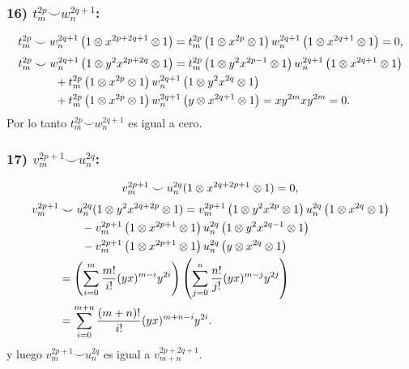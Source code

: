\documentclass[fleqn,../tesis.tex]{subfiles}
\begin{document}
\subsubsection{16) $t_m^{2p} \smile w_n^{2q + 1}$:}
\begin{align*}
	t_m^{2p}\smile w_n^{2q + 1}\left(1\otimes x^{2p + 2q + 1} \otimes 1\right)
		= t_m^{2p}\left(1\otimes x^{2p}\otimes 1\right)w_n^{2q + 1}\left(1\otimes x^{2q + 1}\otimes 1\right) = 0,
\end{align*}
\begin{align*}
	t_m^{2p} & \smile w_n^{2q + 1}\left(1\otimes y^2x^{2p + 2q} \otimes 1\right)
		= t_m^{2p}\left(1\otimes y^2x^{2p - 1}\otimes 1\right)w_n^{2q + 1}\left(1\otimes x^{2q + 1}\otimes 1\right)\\
	&\qquad + t_m^{2p}\left(1 \otimes x^{2p} \otimes 1\right)w_n^{2q + 1}\left(1\otimes y^2x^{2q}\otimes 1\right)\\
	&\qquad + t_m^{2p}\left(1 \otimes x^{2p} \otimes 1\right)w_n^{2q + 1}\left(y\otimes x^{2q +1}\otimes 1\right)
	= xy^{2m}xy^{2m} = 0.
\end{align*}
Por lo tanto $t_m^{2p}\smile w_n^{2q + 1}$ es igual a cero.
\subsubsection{17) $v_m^{2p + 1} \smile u_n^{2q}$:}
\begin{align*}
	v_m^{2p + 1} \smile u_n^{2q}(1 \otimes x^{2q + 2p + 1} \otimes 1) = 0,
\end{align*}
\begin{align*}
	v_m^{2p + 1} &\smile u_n^{2q}(1 \otimes y^2x^{2q + 2p} \otimes 1)
		= v_m^{2p + 1}\left(1\otimes y^2x^{2p}\otimes 1\right)u_n^{2q}\left(1\otimes x^{2q}\otimes 1\right)\\
	&\qquad - v_m^{2p + 1}\left(1 \otimes x^{2p + 1}  \otimes 1\right)u_n^{2q}\left(1\otimes y^2x^{2q - 1}\otimes 1\right)\\
	&\qquad - v_m^{2p + 1}\left(1 \otimes x^{2p + 1} \otimes 1\right)u_n^{2q}\left(y\otimes x^{2q}\otimes 1\right)\\
	&= \left(\sum_{i = 0}^{m}\frac{m!}{i!}(yx)^{m - i}y^{2i}\right)
		\left(\sum_{j = 0}^{n}\frac{n!}{j!}(yx)^{m - j}y^{2j}\right)\\
	&= \sum_{i = 0}^{m + n}\frac{(m + n)!}{i!}(yx)^{m + n - i}y^{2i}.
\end{align*}
y luego $v_m^{2p + 1} \smile u_n^{2q}$ es igual a $v_{m + n}^{2p + 2q + 1}$.
\end{document}
